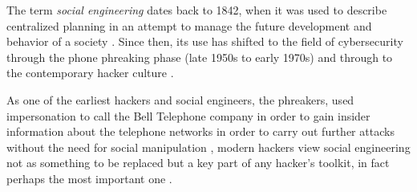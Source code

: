 The term \textit{social engineering} dates back to 1842, when it was used to describe centralized planning in an attempt to manage the future development and behavior of a society \citep{hatfieldSocialEngineeringCybersecurity2018a}. Since then, its use has shifted to the field of cybersecurity through the phone phreaking phase (late 1950s to early 1970s) and through to the contemporary hacker culture \citep{wangDefiningSocialEngineering2020}.



As one of the earliest hackers and social engineers, the phreakers, used impersonation to call the Bell Telephone company in order to gain insider information about the telephone networks in order to carry out further attacks without the need for social manipulation \citep{hatfieldSocialEngineeringCybersecurity2018a}, modern hackers view social engineering not as something to be replaced but a key part of any hacker's toolkit, in fact perhaps the most important one \citep{mitnickArtDeceptionControlling2003}.



